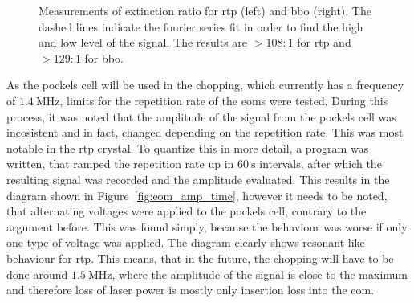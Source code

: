 \begin{figure}[t]
\label{fig:eom_extinction}
\caption{Measurements of extinction ratio for \ac{rtp} (left) and \ac{bbo} (right). The dashed lines indicate the fourier series fit in order to find the high and low level of the signal. The results are $>108:1$ for \ac{rtp} and $>129:1$ for \ac{bbo}.}
\end{figure}


As the pockels cell will be used in the chopping, which currently has a frequency of $\SI{1.4}{\mega\hertz}$, limits for the repetition rate of the \acp{eom} were tested. During this process, it was noted that the amplitude of the signal from the pockels cell was incosistent and in fact, changed depending on the repetition rate. This was most notable in the \ac{rtp} crystal. To quantize this in more detail, a program was written, that ramped the repetition rate up in $\SI{60}{\second}$ intervals, after which the resulting signal was recorded and the amplitude evaluated. This results in the diagram shown in Figure~\ref{fig:eom_amp_time}, however it needs to be noted, that alternating voltages were applied to the pockels cell, contrary to the argument before. This was found simply, because the behaviour was worse if only one type of voltage was applied. The diagram clearly shows resonant-like behaviour for \ac{rtp}. This means, that in the future, the chopping will have to be done around $\SI{1.5}{\mega\hertz}$, where the amplitude of the signal is close to the maximum and therefore loss of laser power is mostly only insertion loss into the \ac{eom}.

